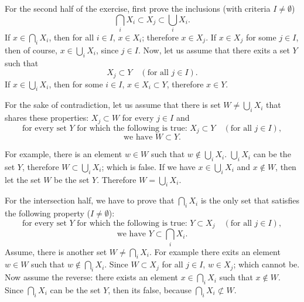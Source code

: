 For the second half of the exercise, first prove the inclusions (with criteria $I \neq \emptyset$)
\[
	\bigcap_i X_i \subset X_j \subset \bigcup_i X_i.
\]
If $x \in \bigcap_i X_i$, then for all $i \in I$, $x \in X_i$; therefore $x \in X_j$. If $x \in X_j$ for some $j \in I$, then of course, $x \in \bigcup_i X_i$, since $j \in I$. Now, let us assume that there exits a set $Y$ such that
\[
	X_j \subset Y \quad (\text{for all } j \in I).
\]
If $x \in \bigcup_i X_i$, then for some $i \in I$, $x \in X_i \subset Y$, therefore $x \in Y$.

For the sake of contradiction, let us assume that there is set $W \neq \bigcup_i X_i$ that shares these properties: $X_j \subset W$ for every $j \in I$ and
\[
	\text{for every set } Y \text{ for which the following is true: } X_j \subset Y \quad (\text{for all } j \in I),
\]
\[
	\text{we have } W \subset Y.
\]

For example, there is an element $w \in W$ such that $w \not \in \bigcup_i X_i$. $\bigcup_i X_i$ can be the set $Y$, therefore $W \subset \bigcup_i X_i$; which is false. If we have $x \in \bigcup_i X_i$ and $x \not \in W$, then let the set $W$ be the set $Y$. Therefore $W = \bigcup_i X_i$.

For the intersection half, we have to prove that $\bigcap_i X_i$ is the only set that satisfies the following property ($I \neq \emptyset$):
\[
	\text{for every set } Y \text{ for which the following is true: } Y \subset X_j \quad (\text{for all } j \in I),
\]
\[
	\text{we have } Y \subset \bigcap_i X_i.
\]
Assume, there is another set $W \neq \bigcap_i X_i$. For example there exits an element $w \in W$ such that $w \not \in \bigcap_i X_i$. Since $W \subset X_j$ for all $j \in I$, $w \in X_j$; which cannot be. Now assume the reverse: there exists an element $x \in \bigcap_i X_i$ such that $x \not \in W$. Since $\bigcap_i X_i$ can be the set $Y$, then its false, because $\bigcap_i X_i \not \subset W$.